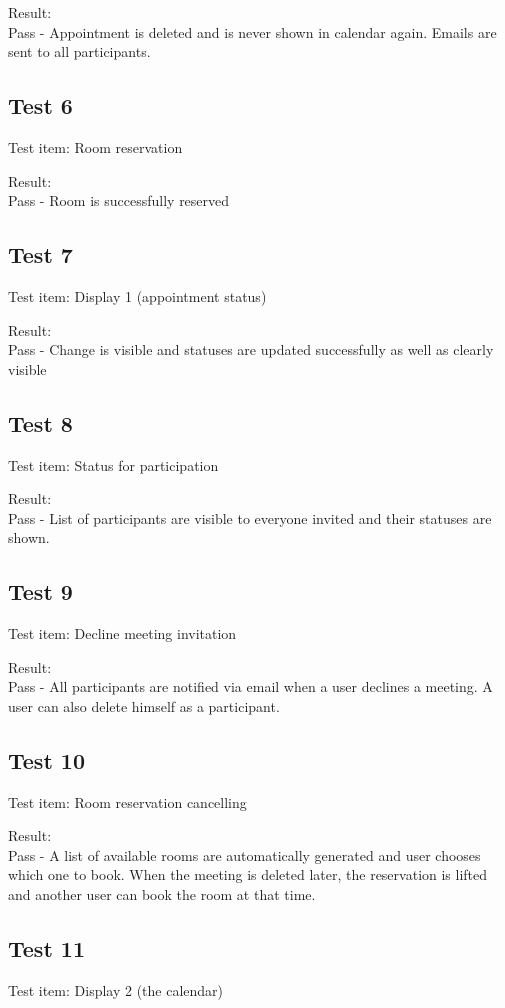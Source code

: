 Result: \\Pass - Appointment is deleted and is never shown in calendar again. Emails are sent to all participants.

\subsection{Test 6}
Test item: Room reservation

Result: \\ Pass - Room is successfully reserved

\subsection{Test 7}
Test item: Display 1 (appointment status)

Result: \\Pass - Change is visible and statuses are updated successfully as well as clearly visible

\subsection{Test 8}
Test item: Status for participation

Result: \\Pass - List of participants are visible to everyone invited and their statuses are shown.

\subsection{Test 9}
Test item: Decline meeting invitation

Result: \\Pass - All participants are notified via email when a user declines a meeting. A user can also delete himself as a participant.

\subsection{Test 10}
Test item: Room reservation cancelling

Result: \\Pass - A list of available rooms are automatically generated and user chooses which one to book. When the meeting is deleted later, the reservation is lifted and another user can book the room at that time.

\subsection{Test 11}
Test item: Display 2 (the calendar)

